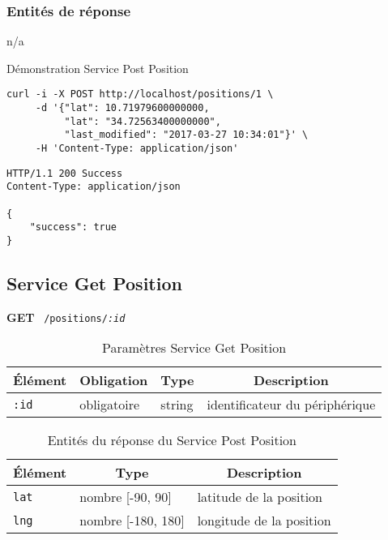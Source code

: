 \subsubsection*{Entités de réponse}

n/a

\begin{listing}
    \caption*{Démonstration Service Post Position}
    \begin{verbatim}
curl -i -X POST http://localhost/positions/1 \
     -d '{"lat": 10.71979600000000,
          "lat": "34.72563400000000",
          "last_modified": "2017-03-27 10:34:01"}' \
     -H 'Content-Type: application/json'
\end{verbatim}
\begin{verbatim}
HTTP/1.1 200 Success
Content-Type: application/json

{
    "success": true
}
\end{verbatim}
\end{listing}

\clearpage
\subsection{Service Get Position}
\label{appendix:sprint1-position-get-doc}

\textbf{GET} \ \texttt{/positions/\textit{:id}}

\begin{table}[htbp]
    \centering
    \caption*{Paramètres Service Get Position}
    \begin{tabular}{llll}
        \toprule
        \multicolumn{1}{c}{\textbf{Élément}} &
        \multicolumn{1}{c}{\textbf{Obligation}} &
        \multicolumn{1}{c}{\textbf{Type}} &
        \multicolumn{1}{c}{\textbf{Description}} \\
        \midrule
        \verb|:id| & obligatoire & string & identificateur du périphérique \\
        \bottomrule
    \end{tabular}
\end{table}

\begin{table}[htbp]
    \centering
    \caption*{Entités du réponse du Service Post Position}
    \begin{tabular}{lll}
        \toprule
        \multicolumn{1}{c}{\textbf{Élément}} &
        \multicolumn{1}{c}{\textbf{Type}} &
        \multicolumn{1}{c}{\textbf{Description}} \\
        \midrule
        \verb|lat| & nombre [-90, 90] & latitude de la position \\
        \verb|lng| & nombre [-180, 180] & longitude de la position \\
        \bottomrule
    \end{tabular}
\end{table}

